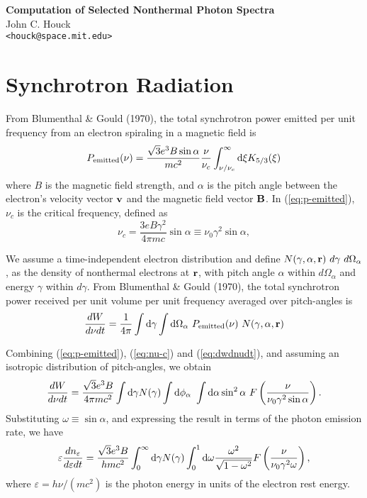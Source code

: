 \documentclass[12pt]{article}
\newcommand{\D}{{\rm d}}
\begin{document}
\begin{center}
{\Large\bf
Computation of Selected Nonthermal Photon Spectra}\\
\large
John C. Houck \\
\verb|<houck@space.mit.edu>|
\end{center}

\section{Synchrotron Radiation}

From Blumenthal \& Gould (1970),
the total synchrotron power emitted per unit frequency
from an electron spiraling in a magnetic field is
\begin{equation}
P_{\rm emitted}(\nu) =
\frac{\sqrt{3} e^3 B \sin\alpha}{mc^2}
\frac{\nu}{\nu_c} \int_{\nu/\nu_c}^\infty \D\xi K_{5/3}(\xi)
\label{eq:p-emitted}
\end{equation}
where $B$ is the magnetic field strength, and
$\alpha$ is the pitch angle between the electron's velocity
vector ${\bf v}$ and the magnetic field vector ${\bf B}$.
In (\ref{eq:p-emitted}), $\nu_c$ is the critical frequency, defined as
\begin{equation}
  \nu_c = \frac{3eB\gamma^2}{4\pi m c} \sin\alpha
  \equiv \nu_0 \gamma^2 \sin\alpha,
\label{eq:nu-c}
\end{equation}

We assume a time-independent electron distribution and define
$N(\gamma, \alpha, {\bf r})~d\gamma~d\Omega_\alpha$, as the
density of nonthermal electrons at ${\bf r}$, with pitch angle
$\alpha$ within $d\Omega_\alpha$ and energy $\gamma$ within
$d\gamma$. From Blumenthal \& Gould (1970), the total
synchrotron power received per unit volume per unit frequency
averaged over pitch-angles is
\begin{equation}
\frac{dW}{d\nu dt} = \frac{1}{4\pi}\int \D\gamma \int \D\Omega_\alpha~
              P_{\rm emitted}(\nu)~N(\gamma, \alpha, {\bf r})
\label{eq:dwdnudt}
\end{equation}

Combining (\ref{eq:p-emitted}), (\ref{eq:nu-c}) and
(\ref{eq:dwdnudt}), and assuming an isotropic distribution
of pitch-angles, we obtain
\begin{equation}
\frac{dW}{d\nu dt} =
\frac{\sqrt{3} e^3 B}{4\pi mc^2}
\int \D\gamma N(\gamma) \int \D\phi_\alpha~ \int \D\alpha
\sin^2\alpha ~F\left(\frac{\nu}{\nu_0\gamma^2\sin\alpha}\right).
\end{equation}
Substituting $\omega\equiv \sin\alpha$, and
expressing the result in terms of the photon emission rate, we have
\begin{equation}
\varepsilon\frac{dn_\varepsilon}{d\varepsilon dt} =
\frac{\sqrt{3} e^3 B}{hmc^2}
\int_0^\infty \D\gamma N(\gamma) \int_0^1 \D \omega
\frac{\omega^2}{\sqrt{1 - \omega^2}} F\left(\frac{\nu}{\nu_0\gamma^2 \omega}\right),
\label{eq:sync-emis1}
\end{equation}
where $\varepsilon = h\nu/(mc^2)$ is the photon energy in units
of the electron rest energy.
\end{document}

